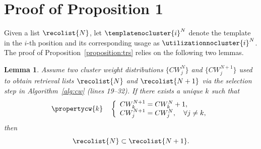 \newtheorem{lemma}{Lemma}
\newtheorem{proof}{Proof}
\newtheorem{theorem}{Theorem}
\newtheorem{proposition}{Proposition}


\section{Proof of Proposition 1}
\label{sec:proof-trs-properties}

Given a list $\recolist{N}$, let $\templatenocluster{i}^{N}$ denote the template in the $i$-th position and its corresponding usage as $\utilizationnocluster{i}^{N}$. The proof of Proposition~\ref{proposition:trs} relies on the following two lemmas.

\begin{lemma}
Assume two cluster weight distributions $\{CW_j^{N}\}$ and $\{CW_j^{N+1}\}$ used to obtain retrieval lists $\recolist{N}$ and $\recolist{N+1}$ via the selection step in Algorithm~\ref{alg:cw} (lines 19--32). If there exists a unique $k$ such that
\begin{equation}
\propertycw{k} 
\quad
\left\{
\begin{array}{l}
    CW_{k}^{N+1} = CW_{k}^{N} + 1, \\
    CW_j^{N+1} = CW_j^{N}, \quad \forall j \neq k,
\end{array}
\right.
\end{equation}
then
\begin{equation}
\recolist{N} \subset \recolist{N+1}.
\label{eq:lemma-1:conclusion}
\end{equation}
\label{lemma:lemma-1}
\end{lemma}

